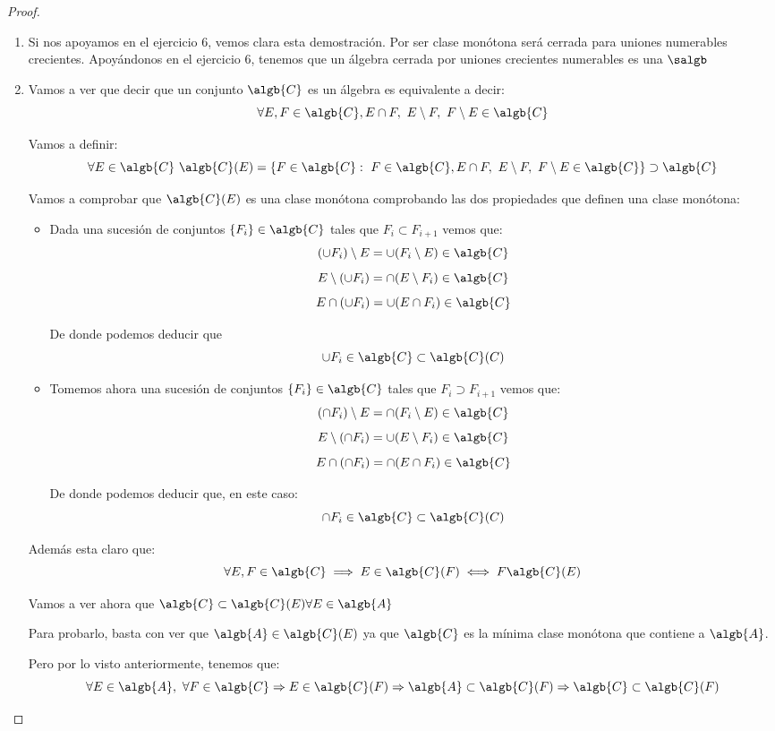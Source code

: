 \begin{problem}[14]
\begin{proof}
\begin{enumerate}
\item Si nos apoyamos en el ejercicio 6, vemos clara esta demostración. Por ser clase monótona será cerrada para uniones numerables crecientes. Apoyándonos en el ejercicio 6, tenemos que un álgebra cerrada por uniones crecientes numerables es una $\salgb$

\item Vamos a ver que decir que un conjunto $\algb{C}$ es un álgebra es equivalente a decir:
\[\forall E,F \in \algb{C}, E\cap F, \ E\setminus F, \ F\setminus E \in \algb{C}\]

Vamos a definir:
\[\forall E \in \algb{C} \ \algb{C}(E)=\{F \in \algb{C}: \ F \in \algb{C}, E\cap F, \ E\setminus F, \ F\setminus E \in \algb{C}\} \supset \algb{C}\]

Vamos a comprobar que $\algb{C}(E)$ es una clase monótona comprobando las dos propiedades que definen una clase monótona:
\begin{itemize}
\item Dada una sucesión de conjuntos $\{F_i\} \in \algb{C}$ tales que $F_i \subset F_{i+1}$ vemos que:
\ppart \[(\cup F_i)\setminus E = \cup (F_i \setminus E) \in \algb{C}\]
\ppart \[E \setminus (\cup F_i) = \cap(E \setminus F_i) \in \algb{C}\]
\ppart \[E \cap (\cup F_i) = \cup (E \cap F_i) \in \algb{C}\]

De donde podemos deducir que
\[\cup F_i \in \algb{C} \subset \algb{C}(C)\]

\item Tomemos ahora una sucesión de conjuntos $\{F_i\}\in \algb{C}$ tales que $F_i \supset F_{i+1}$ vemos que:
\ppart \[(\cap F_i)\setminus E = \cap (F_i \setminus E) \in \algb{C}\]
\ppart \[E \setminus (\cap F_i) = \cup(E\setminus F_i) \in \algb{C}\]
\ppart \[E \cap (\cap F_i) = \cap (E \cap F_i)\in \algb{C}\]

De donde podemos deducir que, en este caso:
\[\cap F_i \in \algb{C} \subset \algb{C}(C)\]
\end{itemize}

Además esta claro que:
\[\forall E,F \in \algb{C} \implies E\in \algb{C}(F) \iff F \algb{C}(E)\]

Vamos a ver ahora que $\algb{C} \subset \algb{C}(E) \forall E \in \algb{A}$

Para probarlo, basta con ver que $\algb{A} \in \algb{C}(E)$ ya que $\algb{C}$ es la mínima clase monótona que contiene a $\algb{A}$.

Pero por lo visto anteriormente, tenemos que:
\[\forall E \in \algb{A}, \ \forall F \in \algb{C} \Rightarrow E \in \algb{C}(F) \Rightarrow \algb{A} \subset \algb{C}(F) \Rightarrow \algb{C} \subset \algb{C}(F)\]

\end{enumerate}
\end{proof}
\end{problem}

